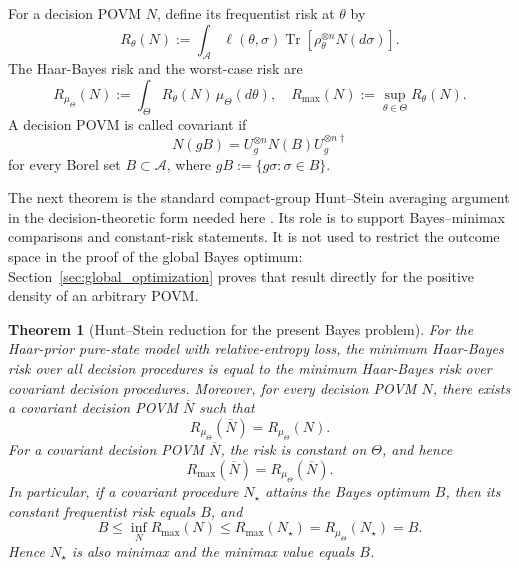 \documentclass[journal]{IEEEtran}
\newtheorem{theorem}{Theorem}
\begin{document}
For a decision POVM \(N\), define its frequentist risk at \(\theta\) by
\[
    R_\theta(N)
    :=
    \int_{\mathcal A}
    \ell(\theta,\sigma)
    \operatorname{Tr}\!\left[
        \rho_\theta^{\otimes n}N(d\sigma)
    \right].
\]
The Haar-Bayes risk and the worst-case risk are
\[
    R_{\mu_\Theta}(N)
    :=
    \int_\Theta R_\theta(N)\,\mu_\Theta(d\theta),
    \quad
    R_{\max}(N):=\sup_{\theta\in\Theta}R_\theta(N).
\]
A decision POVM is called covariant if
\[
    N(gB)
    =
    U_g^{\otimes n}N(B)U_g^{\otimes n\dagger}
\]
for every Borel set \(B\subset\mathcal A\), where
\(gB:=\{g\sigma:\sigma\in B\}\).

The next theorem is the standard compact-group Hunt--Stein averaging argument
in the decision-theoretic form needed here
\cite{Holevo1979CovariantMeasurements,Holevo1982ProbabilisticStatistical}.
Its role is to support Bayes--minimax comparisons and constant-risk statements.
It is not used to restrict the outcome space in the proof of the global Bayes
optimum: Section~\ref{sec:global_optimization} proves that result directly for
the positive density of an arbitrary POVM.

\begin{theorem}[Hunt--Stein reduction for the present Bayes problem]
\label{thm:covariant_reduction}
For the Haar-prior pure-state model with relative-entropy loss, the minimum
Haar-Bayes risk over all decision procedures is equal to the minimum Haar-Bayes
risk over covariant decision procedures.  Moreover, for every decision POVM
\(N\), there exists a covariant decision POVM \(\overline N\) such that
\[
    R_{\mu_\Theta}(\overline N)=R_{\mu_\Theta}(N).
\]
For a covariant decision POVM \(\overline N\), the risk is constant on
\(\Theta\), and hence
\[
    R_{\max}(\overline N)=R_{\mu_\Theta}(\overline N).
\]
In particular, if a covariant procedure \(N_\star\) attains the Bayes optimum
\(B\), then its constant frequentist risk equals \(B\), and
\[
    B
    \le
    \inf_N R_{\max}(N)
    \le
    R_{\max}(N_\star)
    =
    R_{\mu_\Theta}(N_\star)
    =B.
\]
Hence \(N_\star\) is also minimax and the minimax value equals \(B\).
\end{theorem}
\end{document}
